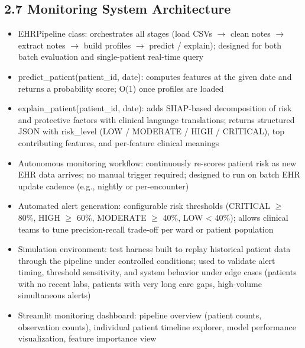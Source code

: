 \documentclass[11pt,a4paper]{article}
\begin{document}
\subsection{2.7 Monitoring System Architecture}
\begin{itemize}
\item EHRPipeline class: orchestrates all stages (load CSVs $\rightarrow$ clean notes $\rightarrow$ extract notes $\rightarrow$ build profiles $\rightarrow$ predict / explain); designed for both batch evaluation and single-patient real-time query
\item predict\_patient(patient\_id, date): computes features at the given date and returns a probability score; O(1) once profiles are loaded
\item explain\_patient(patient\_id, date): adds SHAP-based decomposition of risk and protective factors with clinical language translations; returns structured JSON with risk\_level (LOW / MODERATE / HIGH / CRITICAL), top contributing features, and per-feature clinical meanings
\item Autonomous monitoring workflow: continuously re-scores patient risk as new EHR data arrives; no manual trigger required; designed to run on batch EHR update cadence (e.g., nightly or per-encounter)
\item Automated alert generation: configurable risk thresholds (CRITICAL $\geq$ 80\%, HIGH $\geq$ 60\%, MODERATE $\geq$ 40\%, LOW < 40\%); allows clinical teams to tune precision-recall trade-off per ward or patient population
\item Simulation environment: test harness built to replay historical patient data through the pipeline under controlled conditions; used to validate alert timing, threshold sensitivity, and system behavior under edge cases (patients with no recent labs, patients with very long care gaps, high-volume simultaneous alerts)
\item Streamlit monitoring dashboard: pipeline overview (patient counts, observation counts), individual patient timeline explorer, model performance visualization, feature importance view
\end{itemize}
\end{document}
